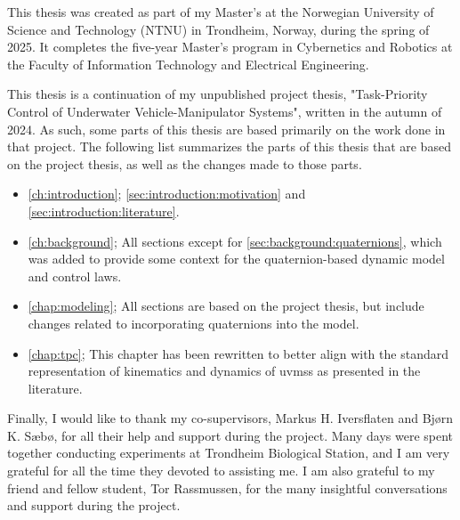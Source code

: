 This thesis was created as part of my Master's at the Norwegian University of Science and Technology (NTNU) in Trondheim, Norway, during the spring of 2025. It completes the five-year Master's program in Cybernetics and Robotics at the Faculty of Information Technology and Electrical Engineering.

This thesis is a continuation of my unpublished project thesis, "Task-Priority Control of Underwater Vehicle-Manipulator Systems", written in the autumn of 2024. As such, some parts of this thesis are based primarily on the work done in that project. The following list
summarizes the parts of this thesis that are based on the project thesis, as well as the changes made to those parts.

\begin{itemize}
    \item \autoref{ch:introduction}; \autoref{sec:introduction:motivation} and \autoref{sec:introduction:literature}.
    \item \autoref{ch:background}; All sections except for \autoref{sec:background:quaternions}, which was added to provide some context for the quaternion-based dynamic model and control laws.
    \item \autoref{chap:modeling}; All sections are based on the project thesis, but include changes related to incorporating quaternions into the model.
    \item \autoref{chap:tpc}; This chapter has been rewritten to better align with the standard representation of kinematics and dynamics of \glspl{uvms} as presented in the literature.
\end{itemize}

Finally, I would like to thank my co-supervisors, Markus H. Iversflaten and Bjørn K. Sæbø, for all their help and support during the project. Many days were spent together conducting experiments at Trondheim Biological Station, and I am very grateful for all the time they devoted to assisting me. I am also grateful to my friend and fellow student, Tor Rassmussen, for the many insightful conversations and support during the project.
